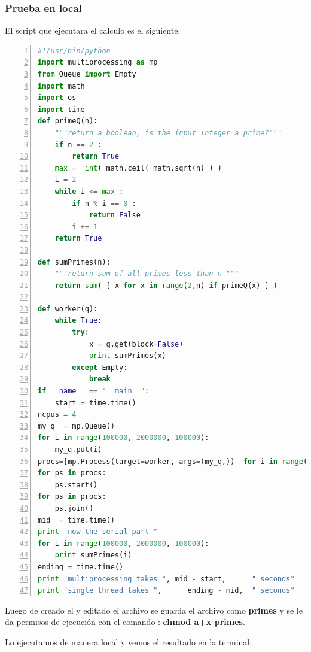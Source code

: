 \subsubsection*{Prueba en local}

El script que ejecutara el calculo es el siguiente:

\begin{lstlisting}[basicstyle=\footnotesize\ttfamily,
  language=Python, 
  numbers=left, 
  numberstyle=\tiny\color{black},
  captionpos=b]
#!/usr/bin/python
import multiprocessing as mp
from Queue import Empty
import math
import os
import time
def primeQ(n):
    """return a boolean, is the input integer a prime?"""
    if n == 2 :
        return True
    max =  int( math.ceil( math.sqrt(n) ) )
    i = 2
    while i <= max :
        if n % i == 0 :
            return False
        i += 1
    return True

def sumPrimes(n):
    """return sum of all primes less than n """
    return sum( [ x for x in range(2,n) if primeQ(x) ] )

def worker(q):
    while True:
        try:
            x = q.get(block=False)
            print sumPrimes(x)
        except Empty:
            break
if __name__ == "__main__":
    start = time.time()
ncpus = 4
my_q  = mp.Queue()
for i in range(100000, 2000000, 100000):
    my_q.put(i)
procs=[mp.Process(target=worker, args=(my_q,))  for i in range(ncpus)]
for ps in procs:
    ps.start()
for ps in procs:
    ps.join()
mid  = time.time()
print "now the serial part "
for i in range(100000, 2000000, 100000):
    print sumPrimes(i)
ending = time.time()
print "multiprocessing takes ", mid - start,      " seconds"
print "single thread takes ",      ending - mid,  " seconds"
\end{lstlisting}

Luego de creado el y editado el archivo se guarda el archivo como \textbf{primes} y se le da permisos de ejecución con el comando : \textbf{chmod a+x primes}.

Lo ejecutamos de manera local y vemos el resultado en la terminal:

